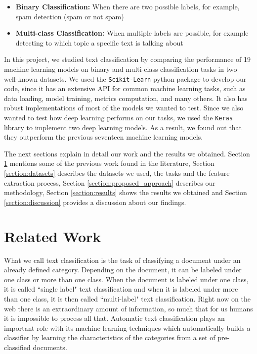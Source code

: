 \documentclass[conference]{IEEEtran}
\begin{document}
\begin{itemize}
    \item \textbf{Binary Classification:} When there are two possible labels, for example, spam detection (spam or not spam)
    \item \textbf{Multi-class Classification:} When multiple labels are possible, for example detecting to which topic a specific text is talking about
\end{itemize}

In this project, we studied text classification by comparing the performance of 19 machine learning models on binary and multi-class classification tasks in two well-known datasets. We used the \texttt{Scikit-Learn} python package \cite{scikit-learn} to develop our code, since it has an extensive API for common machine learning tasks, such as data loading, model training, metrics computation, and many others. It also has robust implementations of most of the models we wanted to test. Since we also wanted to test how deep learning performs on our tasks, we used the \texttt{Keras} library \cite{chollet2015keras} to implement two deep learning models. As a result, we found out that they outperform the previous seventeen machine learning models.

The next sections explain in detail our work and the results we obtained. Section \ref{section:related_work} mentions some of the previous work found in the literature, Section \ref{section:datasets} describes the datasets we used, the tasks and the feature extraction process, Section \ref{section:proposed_approach} describes our methodology, Section \ref{section:results} shows the results we obtained and Section \ref{section:discussion} provides a discussion about our findings.

\section{Related Work}
\label{section:related_work}
What we call text classification is the task of classifying a document under an already defined category\cite{jindal2015techniques}. Depending on the document, it can be labeled under one class or more than one class. When the document is labeled under one class, it is called ``single label" text classification and when it is labeled under more than one class, it is then called ``multi-label" text classification\cite{jindal2015techniques}. Right now on the web there is an extraordinary amount of information, so much that for us humans it is impossible to process all that. Automatic text classification plays an important role with its machine learning techniques which automatically builds a classifier by learning the characteristics of the categories from a set of pre-classified documents\cite{sebastiani2002machine}. 
\end{document}
